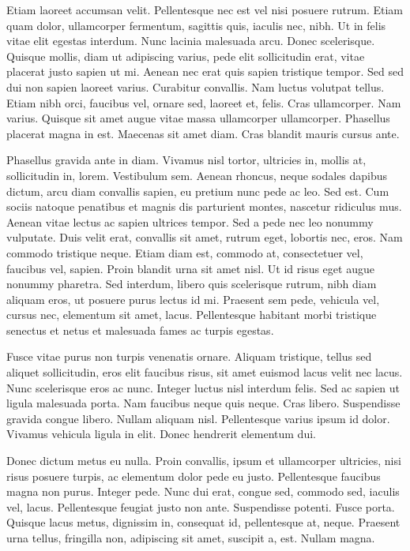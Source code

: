 \documentclass{book}
\begin{document}
Etiam laoreet accumsan velit. Pellentesque nec est vel nisi posuere rutrum. Etiam quam dolor, ullamcorper fermentum, sagittis quis, iaculis nec, nibh. Ut in felis vitae elit egestas interdum. Nunc lacinia malesuada arcu. Donec scelerisque. Quisque mollis, diam ut adipiscing varius, pede elit sollicitudin erat, vitae placerat justo sapien ut mi. Aenean nec erat quis sapien tristique tempor. Sed sed dui non sapien laoreet varius. Curabitur convallis. Nam luctus volutpat tellus. Etiam nibh orci, faucibus vel, ornare sed, laoreet et, felis. Cras ullamcorper. Nam varius. Quisque sit amet augue vitae massa ullamcorper ullamcorper. Phasellus placerat magna in est. Maecenas sit amet diam. Cras blandit mauris cursus ante.

Phasellus gravida ante in diam. Vivamus nisl tortor, ultricies in, mollis at, sollicitudin in, lorem. Vestibulum sem. Aenean rhoncus, neque sodales dapibus dictum, arcu diam convallis sapien, eu pretium nunc pede ac leo. Sed est. Cum sociis natoque penatibus et magnis dis parturient montes, nascetur ridiculus mus. Aenean vitae lectus ac sapien ultrices tempor. Sed a pede nec leo nonummy vulputate. Duis velit erat, convallis sit amet, rutrum eget, lobortis nec, eros. Nam commodo tristique neque. Etiam diam est, commodo at, consectetuer vel, faucibus vel, sapien. Proin blandit urna sit amet nisl. Ut id risus eget augue nonummy pharetra. Sed interdum, libero quis scelerisque rutrum, nibh diam aliquam eros, ut posuere purus lectus id mi. Praesent sem pede, vehicula vel, cursus nec, elementum sit amet, lacus. Pellentesque habitant morbi tristique senectus et netus et malesuada fames ac turpis egestas.

Fusce vitae purus non turpis venenatis ornare. Aliquam tristique, tellus sed aliquet sollicitudin, eros elit faucibus risus, sit amet euismod lacus velit nec lacus. Nunc scelerisque eros ac nunc. Integer luctus nisl interdum felis. Sed ac sapien ut ligula malesuada porta. Nam faucibus neque quis neque. Cras libero. Suspendisse gravida congue libero. Nullam aliquam nisl. Pellentesque varius ipsum id dolor. Vivamus vehicula ligula in elit. Donec hendrerit elementum dui.

Donec dictum metus eu nulla. Proin convallis, ipsum et ullamcorper ultricies, nisi risus posuere turpis, ac elementum dolor pede eu justo. Pellentesque faucibus magna non purus. Integer pede. Nunc dui erat, congue sed, commodo sed, iaculis vel, lacus. Pellentesque feugiat justo non ante. Suspendisse potenti. Fusce porta. Quisque lacus metus, dignissim in, consequat id, pellentesque at, neque. Praesent urna tellus, fringilla non, adipiscing sit amet, suscipit a, est. Nullam magna.
\end{document}
